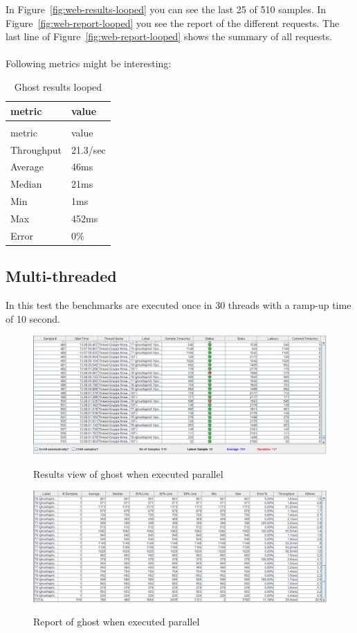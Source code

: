 In Figure~\ref{fig:web-results-looped} you can see the last 25 of 510 samples. In Figure~\ref{fig:web-report-looped} you see the report of the different requests. The last line of Figure~\ref{fig:web-report-looped} shows the summary of all requests. \\ \\
Following metrics might be interesting: \\
\begin{longtable}{ll}
	\caption{Ghost results looped}\\
	metric&value\\
	\hline
	\endfirsthead
	\caption[]{Ghost results looped}\\
	metric&value\\
	\hline
	\endhead
	Throughput & 21.3/sec \\
	Average & 46ms \\
	Median & 21ms \\
	Min & 1ms \\
	Max & 452ms \\
	Error & 0\% \\
\end{longtable}

\subsection{Multi-threaded}
In this test the benchmarks are executed once in 30 threads with a ramp-up time of 10 second. 

\begin{figure}[!h]
  \caption{Results view of ghost when executed parallel}
  \centering
    \includegraphics[width=1\textwidth]{Screenshots/web-results-threaded}
   	\label{fig:web-results-threaded}
\end{figure}

\begin{figure}[!h]
  \caption{Report of ghost when executed parallel}
  \centering
    \includegraphics[width=1\textwidth]{Screenshots/web-report-threaded}
   	\label{fig:web-report-threaded}
\end{figure}

